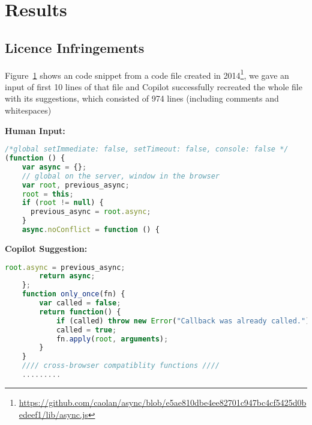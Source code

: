 \section{Results}
\subsection{Licence Infringements}
\label{licence}

Figure~\ref{} shows an code snippet from a code file created in 2014\footnote{\url{https://github.com/caolan/async/blob/e5ae810dbe4ee82701c947bc4cf5425d0bedeef1/lib/async.js}}, we gave an input of first 10 lines of that file and Copilot successfully recreated the whole file with its suggestions, which consisted of 974 lines (including comments and whitespaces)


\begin{tcolorbox}[title=Licence Infringement,boxsep=.5mm]
\textbf{Human Input:}
\begin{lstlisting}[language={JavaScript}]
/*global setImmediate: false, setTimeout: false, console: false */
(function () {
    var async = {};
    // global on the server, window in the browser
    var root, previous_async;
    root = this;
    if (root != null) {
      previous_async = root.async;
    }
    async.noConflict = function () {
\end{lstlisting}
\tcbline
\textbf{Copilot Suggestion:}
\begin{lstlisting}[language=JavaScript,escapechar=\%]
        root.async = previous_async;
        return async;
    };
    function only_once(fn) {
        var called = false;
        return function() {
            if (called) throw new Error("Callback was already called.");
            called = true;
            fn.apply(root, arguments);
        }
    }
    //// cross-browser compatiblity functions ////
    .........
\end{lstlisting}
\end{tcolorbox}